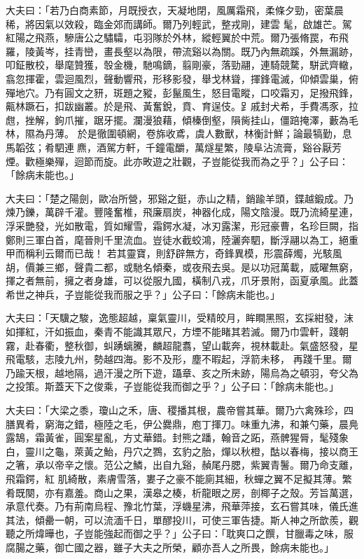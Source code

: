 \begin{pinyinscope}
 大夫曰：「若乃白商素節，月既授衣，天凝地閉，風厲霜飛，柔條夕勁，密葉晨稀，將因氣以效殺，臨金郊而講師。爾乃列輕武，整戎剛，建雲
 髦，啟雄芒。駕紅陽之飛燕，驂唐公之驌驦，屯羽隊於外林，縱輕翼於中荒。爾乃張脩罠，布飛羅，陵黃岑，挂青巒，畫長壑以為限，帶流谿以為關。既乃內無疏蹊，外無漏跡，叩鉦散校，舉麾贊獲，彀金機，馳鳴鏑，翦剛豪，落勁翮，連騎競騖，駢武齊轍，翕忽揮霍，雲迴風烈，聲動響飛，形移影發，舉戈林聳，揮鋒電滅，仰傾雲巢，俯殫地穴。乃有圓文之豜，斑題之豵，彭鬣風生，怒目電瞛，口咬霜刃，足撥飛鋒，齀林蹶石，扣跋幽叢。於是飛、黃奮銳，賁、育逞伎。𧾷戚封犬希，手費馮豕，拉甝，挫解，鉤爪摧，踞牙擺。瀾漫狼藉，傾榛倒壑，隕胔挂山，僵踣掩澤，藪為毛林，隰為丹薄。
 於是徹圍頓網，卷旆收鳶，虞人數獸，林衡計鮮；論最犒勤，息馬韜弦；肴駟連麃，酒駕方軒，千鐘電釂，萬燧星繁，陵阜沾流膏，谿谷厭芳煙。歡極樂殫，迴節而旋。此亦畋遊之壯觀，子豈能從我而為之乎？」公子曰：「餘病未能也。」



 大夫曰：「楚之陽劍，歐冶所營，邪谿之鋌，赤山之精，銷踰羊頭，鍱越鍛成。乃煉乃鑠，萬辟千灌。豐隆奮椎，飛廉扇炭，神器化成，陽文陰漫。既乃流綺星連，浮采艷發，光如散電，質如耀雪，霜鍔水凝，冰刃露潔，形冠豪曹，名珍巨闕，指鄭則三軍白首，麾晉則千里流血。豈徒水截蛟鴻，陸灑奔駟，斷浮翮以為工，絕重甲而稱利云爾而已哉！
 若其靈寶，則舒辟無方，奇鋒異模，形震薛燭，光駭風胡，價兼三鄉，聲貴二都，或馳名傾秦，或夜飛去吳。是以功冠萬載，威曜無窮，揮之者無前，擁之者身雄，可以從服九國，橫制八戎，爪牙景附，函夏承風。此蓋希世之神兵，子豈能從我而服之乎？」公子曰：「餘病未能也。」



 大夫曰：「天驥之駿，逸態超越，稟氣靈川，受精皎月，眸瞷黑照，玄採紺發，沫如揮紅，汗如振血，秦青不能識其眾尺，方堙不能睹其若滅。爾乃巾雲軒，踐朝霧，赴春衢，整秋御，虯踴螭騰，麟超龍翥，望山載奔，視林載赴。氣盛怒發，星飛電駭，志陵九州，勢越四海。影不及形，塵不暇起，浮箭未移，
 再踐千里。爾乃踰天根，越地隔，過汗漫之所下遊，躡章、亥之所未跡，陽烏為之頓羽，夸父為之投策。斯蓋天下之俊乘，子豈能從我而御之乎？」公子曰：「餘病未能也。」



 大夫曰：「大梁之黍，瓊山之禾，唐、稷播其根，農帝嘗其華。爾乃六禽殊珍，四膳異肴，窮海之錯，極陸之毛，伊公爨鼎，庖丁揮刀。味重九沸，和兼勺藥，晨鳧露鵠，霜黃雀，圓案星亂，方丈華錯。封熊之蹯，翰音之跖，燕髀猩脣，髦殘象白，靈川之龜，萊黃之鮐，丹穴之鷚，玄豹之胎，燀以秋橙，酤以春梅，接以商王之箸，承以帝辛之懷。范公之鱗，出自九谿，赬尾丹腮，紫翼青鬐。爾乃命支離，飛霜鍔，紅
 肌綺散，素膚雪落，婁子之豪不能廁其細，秋蟬之翼不足擬其薄。繁肴既闋，亦有嘉羞。商山之果，漢皋之楱，析龍眼之房，剖椰子之殼。芳旨萬選，承意代奏。乃有荊南烏程、豫北竹葉，浮蟣星沸，飛華萍接，玄石嘗其味，儀氏進其法，傾罍一朝，可以流湎千日，單醪投川，可使三軍告捷。斯人神之所歆羨，觀聽之所煒曄也，子豈能強起而御之乎？」公子曰：「耽爽口之饌，甘臘毒之味，服腐腸之藥，御亡國之器，雖子大夫之所榮，顧亦吾人之所畏，餘病未能也。」




\end{pinyinscope}
